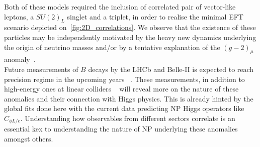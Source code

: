 Both of these models required the inclusion of correlated pair of vector-like leptons, a $SU(2)_L$ singlet and a triplet, in order to realise the minimal EFT scenario depicted on~\autoref{fig:2D_correlations}. We observe that the existence of these particles may be independently motivated by the heavy new dynamics underlying the origin of neutrino masses and/or by a tentative explanation of the $(g-2)_{\mu}$ anomaly~\cite{Kannike:2011ng,Muong-2:2021ojo}.\\

Future measurements of $B$ decays by the LHCb and Belle-II  is expected to reach precision regime in the upcoming years ~\cite{Kou:2018nap,Bediaga:2018lhg}. These measurements, in addition to high-energy ones at linear colliders ~\cite{deBlas:2019rxi,deBlas:2019wgy} will reveal more on the nature of these anomalies and their connection with Higgs physics. This is already hinted by the global fits done here with the current data predicting NP Higgs operators like $ C_{\phi L/e}$. Understanding how observables from different sectors correlate is an essential kex to understanding the nature of NP underlying these anomalies amongst others.


%
%

